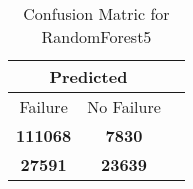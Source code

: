 \begin{table}[] 
\caption{Confusion Matric for RandomForest5} 
\label{Table: Prediction Accuracy-DMDRandomForest5OnlySunEKF-combinationReflection-Reflection} 
\centering 
\begin{tabular} 
 {@{}ccc@{}} 
\toprule 
\multicolumn{2}{c}{\textbf{Predicted}}
 \\ \midrule 
\multicolumn{1}{|c|}{Failure} & 
\multicolumn{1}{c|}{No Failure}
 \\ \midrule 
\multicolumn{1}{|c|}{\color{green}\textbf{111068}} & 
\multicolumn{1}{c|}{\color{red}\textbf{7830}}
 \\ \midrule 
\multicolumn{1}{|c|}{\color{red}\textbf{27591}} & 
\multicolumn{1}{c|}{\color{green}\textbf{23639}}
 \\ \bottomrule 
\end{tabular} 
\end{table} 
